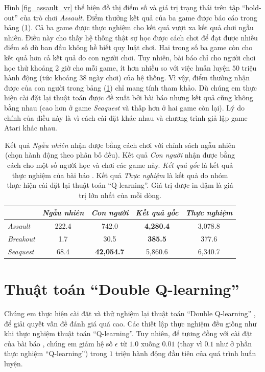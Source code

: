 	Hình \ref{fig_assault_vr} thể hiện đồ thị điểm số và giá trị trạng thái trên tập ``hold-out'' của trò chơi \textit{Assault}.
	Điểm thưởng kết quả của ba game được báo cáo trong bảng (\ref{table_dqn_results}).
	Cả ba game được thực nghiệm cho kết quả vượt xa kết quả chơi ngẫu nhiên.
	Điều này cho thấy hệ thống thật sự học được cách chơi để đạt được nhiều điểm số dù ban đầu không hề biết quy luật chơi.
	Hai trong số ba game còn cho kết quả hơn cả kết quả do con người chơi.
	Tuy nhiên, bài báo \cite{mnihdqn2015} chỉ cho người chơi học thử khoảng 2 giờ cho mỗi game, ít hơn nhiều so với việc huấn luyện $50$ triệu hành động (tức khoảng 38 ngày chơi) của hệ thống.
	Vì vậy, điểm thưởng nhận được của con người trong bảng (\ref{table_dqn_results}) chỉ mang tính tham khảo.
	Dù chúng em thực hiện cài đặt lại thuật toán được đề xuất bởi bài báo \cite{mnihdqn2015} nhưng kết quả cũng không bằng nhau (cao hơn ở game \textit{Seaquest} và thấp hơn ở hai game còn lại).
	Lý do chính của điều này là vì cách cài đặt khác nhau và chương trình giả lập game Atari khác nhau.
	
	\begin{table}
		\centering
		\caption[Điểm thưởng nhận được của thuật toán ``Q-learning'']{
		Kết quả \textit{Ngẫu nhiên} nhận được bằng cách chơi với chính sách ngẫu nhiên (chọn hành động theo phân bố đều).
		Kết quả \textit{Con người} nhận được bằng cách cho một số người học và chơi các game này.
		\textit{Kết quả gốc} là kết quả thực nghiệm của bài báo \cite{mnihdqn2015}.
		Kết quả \textit{Thực nghiệm} là kết quả do nhóm thực hiện cài đặt lại thuật toán ``Q-learning''.
		Giá trị được in đậm là giá trị lớn nhất của mỗi dòng.}
		\label{table_dqn_results}
		\begin{tabular}{| l | c | c | c | c |}
			\hline
			 & \textit{Ngẫu nhiên}\cite{mnihdqn2015} & \textit{Con người}\cite{mnihdqn2015} & \textit{Kết quả gốc}\cite{mnihdqn2015} & \textit{Thực nghiệm} \\
			\hline \hline
			\textit{Assault} & 222.4 & 742.0 & \textbf{4,280.4} & 3,078.8 \\ 
			\hline
			\textit{Breakout} & 1.7 & 30.5 & \textbf{385.5} & 377.6 \\ 
			\hline
			\textit{Seaquest} & 68.4 & \textbf{42,054.7} & 5,860.6 & 6,340.7 \\ 
			\hline
		\end{tabular}		
	\end{table}

\section{Thuật toán ``Double Q-learning''}
	Chúng em thực hiện cài đặt và thử nghiệm lại thuật toán ``Double Q-learning'' \cite{hasselt2010double}, \cite{van2015deep} để giải quyết vấn đề đánh giá quá cao.
	Các thiết lập thực nghiệm đều giống như khi thực nghiệm thuật toán ``Q-learning''.
	Tuy nhiên, để tương đồng với cài đặt của bài báo \cite{van2015deep}, chúng em giảm hệ số $\epsilon$ từ $1.0$ xuống $0.01$ (thay vì $0.1$ như ở phần thực nghiệm ``Q-learning'') trong $1$ triệu hành động đầu tiên của quá trình huấn luyện.
	
